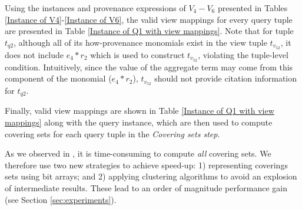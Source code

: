 \begin{example}
Using the instances and provenance expressions of $V_4-V_6$ presented in Tables \ref{Instance of V4}-\ref{Instance of V6}, the valid view mappings for every query tuple are presented in Table \ref{Instance of Q1 with view mappings}. Note that for tuple $t_{q2}$, although all of its how-provenance monomials exist in the view tuple $t_{v_52}$, it does not include $e_4*r_2$ which is used to construct $t_{v_52}$, violating the {tuple-level condition}.  Intuitively, since the value of the aggregate term may come from this component of the monomial ($e_4*r_2$), $t_{v_52}$ should not provide citation information for $t_{q2}$.


Finally, valid view mappings are shown in Table \ref{Instance of Q1 with view mappings} along with the query instance, which are then used to compute covering sets for each query tuple in the {\em Covering sets step}. 
\end{example}

As we observed in \cite{wu2018data}, it is time-consuming to compute {\em all} covering sets. We therefore use two new strategies to achieve speed-up: 1) representing coverings sets using bit arrays; and 2) applying clustering algorithms to avoid an explosion of intermediate results.  These lead to an order of magnitude performance gain (see Section \ref{sec:experiments}).

